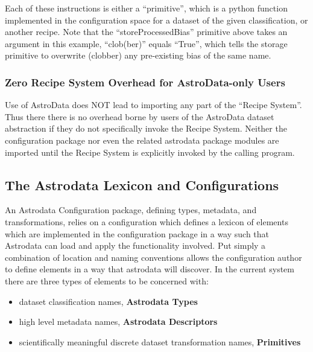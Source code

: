 \documentclass[letterpaper,10pt,english]{sphinxmanual}
\begin{document}
Each of these instructions is either a ``primitive'', which is a python
function implemented in the configuration space for a dataset of the
given classification, or another recipe. Note that the
``storeProcessedBias'' primitive above takes an argument in this
example, ``clob(ber)'' equals ``True'', which tells the storage primitive
to overwrite (clobber) any pre-existing bias of the same name.


\subsubsection{Zero Recipe System Overhead for AstroData-only Users}
\label{gen.ADMANUAL_ADConcepts:zero-recipe-system-overhead-for-astrodata-only-users}
Use of AstroData does NOT lead to importing any part of the ``Recipe
System''. Thus there there is no overhead borne by users of the
AstroData dataset abstraction if they do not specifically invoke the
Recipe System. Neither the configuration package nor even the related
astrodata package modules are imported until the Recipe System is
explicitly invoked by the calling program.


\subsection{The Astrodata Lexicon and Configurations}
\label{gen.ADMANUAL_ADConcepts:the-astrodata-lexicon-and-configurations}
An Astrodata Configuration package, defining types, metadata, and
transformations, relies on a configuration which defines a lexicon of
elements which are implemented in the configuration package in a way
such that Astrodata can load and apply the functionality involved. Put
simply a combination of location and naming conventions allows the
configuration author to define elements in a way that astrodata will
discover. In the current system there are three types of elements to be
concerned with:
\begin{itemize}
\item {} 
dataset classification names, \textbf{Astrodata Types}

\item {} 
high level metadata names, \textbf{Astrodata Descriptors}

\item {} 
scientifically meaningful discrete dataset transformation names,
\textbf{Primitives}

\end{itemize}
\end{document}
